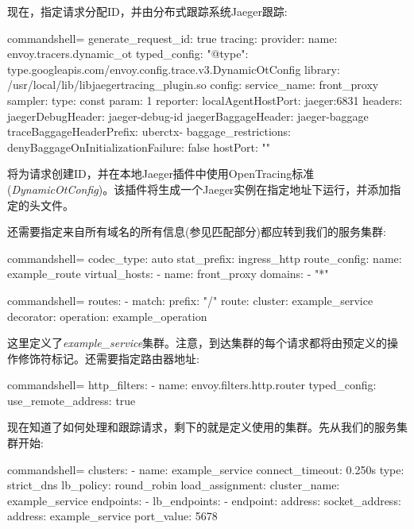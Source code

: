 现在，指定请求分配ID，并由分布式跟踪系统Jaeger跟踪:

\begin{tcblisting}{commandshell={}}
generate_request_id: true
tracing:
  provider:
    name: envoy.tracers.dynamic_ot
    typed_config:
      "@type":
type.googleapis.com/envoy.config.trace.v3.DynamicOtConfig
     library: /usr/local/lib/libjaegertracing_plugin.so
     config:
       service_name: front_proxy
       sampler:
         type: const
         param: 1
       reporter:
         localAgentHostPort: jaeger:6831
       headers:
         jaegerDebugHeader: jaeger-debug-id
         jaegerBaggageHeader: jaeger-baggage
         traceBaggageHeaderPrefix: uberctx-
       baggage_restrictions:
         denyBaggageOnInitializationFailure: false
         hostPort: ""
\end{tcblisting}

将为请求创建ID，并在本地Jaeger插件中使用OpenTracing标准(\textit{DynamicOtConfig})。该插件将生成一个Jaeger实例在指定地址下运行，并添加指定的头文件。

还需要指定来自所有域名的所有信息(参见匹配部分)都应转到我们的服务集群:

\begin{tcblisting}{commandshell={}}
codec_type: auto
stat_prefix: ingress_http
route_config:
  name: example_route
  virtual_hosts:
    - name: front_proxy
      domains:
        - "*"
\end{tcblisting}
\begin{tcblisting}{commandshell={}}
      routes:
        - match:
            prefix: "/"
          route:
            cluster: example_service
          decorator:
            operation: example_operation
\end{tcblisting}

这里定义了\textit{example\_service}集群。注意，到达集群的每个请求都将由预定义的操作修饰符标记。还需要指定路由器地址:

\begin{tcblisting}{commandshell={}}
http_filters:
- name: envoy.filters.http.router
  typed_config: {}
use_remote_address: true
\end{tcblisting}

现在知道了如何处理和跟踪请求，剩下的就是定义使用的集群。先从我们的服务集群开始:

\begin{tcblisting}{commandshell={}}
clusters:
  - name: example_service
    connect_timeout: 0.250s
    type: strict_dns
    lb_policy: round_robin
    load_assignment:
      cluster_name: example_service
      endpoints:
        - lb_endpoints:
        - endpoint:
            address:
              socket_address:
                address: example_service
                port_value: 5678
\end{tcblisting}

